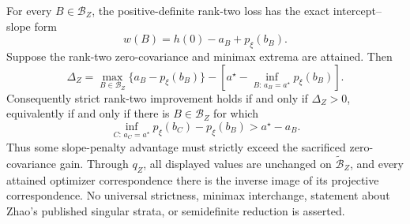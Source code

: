 For every \(B\in\mathcal B_Z\), the positive-definite rank-two loss has the exact intercept--slope form
\[
w(B)=h(0)-a_B+p_\xi(b_B).
\]
Suppose the rank-two zero-covariance and minimax extrema are attained.  Then
\[
\Delta_Z=
\max_{B\in\mathcal B_Z}\{a_B-p_\xi(b_B)\}
-\left[a^\star-\inf_{B:\,a_B=a^\star}p_\xi(b_B)\right].
\]
Consequently strict rank-two improvement holds if and only if \(\Delta_Z>0\), equivalently if and only if there is \(B\in\mathcal B_Z\) for which
\[
\inf_{C:\,a_C=a^\star}p_\xi(b_C)-p_\xi(b_B)
>a^\star-a_B.
\]
Thus some slope-penalty advantage must strictly exceed the sacrificed zero-covariance gain.  Through \(q_Z\), all displayed values are unchanged on \(\widetilde{\mathcal B}_Z\), and every attained optimizer correspondence there is the inverse image of its projective correspondence.  No universal strictness, minimax interchange, statement about Zhao's published singular strata, or semidefinite reduction is asserted.
